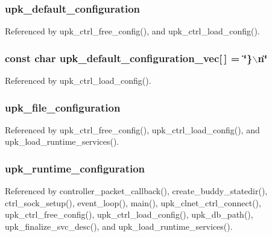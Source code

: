 \subsubsection[{upk\_\-default\_\-configuration}]{ {\bf upk\_\-default\_\-configuration}}\label{group__config__impl_gaefda54e715b67195adc6ee3b56671e56}


Referenced by upk\_\-ctrl\_\-free\_\-config(), and upk\_\-ctrl\_\-load\_\-config().

\subsubsection[{upk\_\-default\_\-configuration\_\-vec}]{\setlength{\rightskip}{0pt plus 5cm}const char {\bf upk\_\-default\_\-configuration\_\-vec}[$\,$] = \char`\"{}\}$\backslash$n\char`\"{}}\label{group__config__impl_ga3f4f40d56f2c3f75a25d5d62e238a362}


Referenced by upk\_\-ctrl\_\-load\_\-config().

\subsubsection[{upk\_\-file\_\-configuration}]{ {\bf upk\_\-file\_\-configuration}}\label{group__config__impl_ga63e376b66da63c0b37258f999eff12f8}


Referenced by upk\_\-ctrl\_\-free\_\-config(), upk\_\-ctrl\_\-load\_\-config(), and upk\_\-load\_\-runtime\_\-services().

\subsubsection[{upk\_\-runtime\_\-configuration}]{ {\bf upk\_\-runtime\_\-configuration}}\label{group__config__impl_gaf7638ba77297c6ad954805d92fa33c13}


Referenced by controller\_\-packet\_\-callback(), create\_\-buddy\_\-statedir(), ctrl\_\-sock\_\-setup(), event\_\-loop(), main(), upk\_\-clnet\_\-ctrl\_\-connect(), upk\_\-ctrl\_\-free\_\-config(), upk\_\-ctrl\_\-load\_\-config(), upk\_\-db\_\-path(), upk\_\-finalize\_\-svc\_\-desc(), and upk\_\-load\_\-runtime\_\-services().


